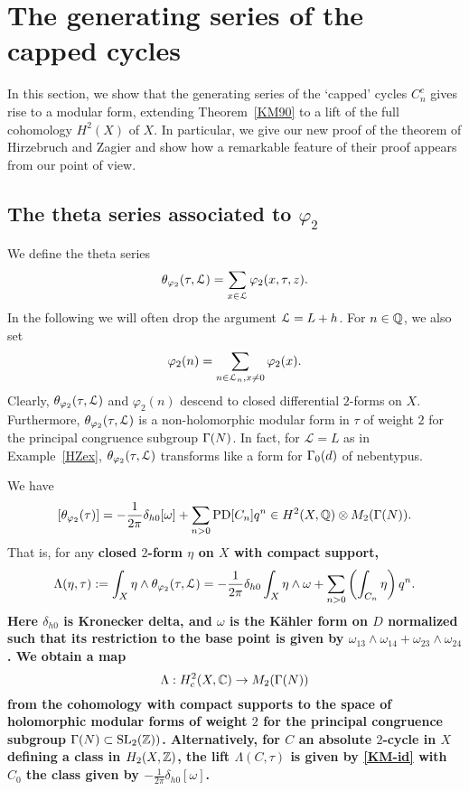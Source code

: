 \section{The generating series of the capped cycles}

In this section, we show that the generating series of the `capped'
cycles $C_n^c$ gives rise to a modular form, extending Theorem~\ref{KM90}
to a lift of the full cohomology $H^2(X)$ of $X$. In particular,
we give our new proof of the theorem of Hirzebruch and Zagier and
show how a remarkable feature of their proof appears from our point
of view.


\subsection{The theta series associated to $\varphi_2$}

We define the theta series
\[
\theta_{\varphi_2}(\tau,\mathcal{L}) = \sum_{x \in \mathcal{L}} \varphi_2(x,\tau,z).
\]
 In the following we will often drop the argument $\mathcal{L} = L+h$. For $n \in \mathbb{Q}$, we also set 
\[
\varphi_2(n) = \sum_{n \in \mathcal{L}_n, x \ne0} \varphi_2(x).
\]
Clearly, $\theta_{\varphi_2}(\tau,\mathcal{L})$ and $\varphi_2(n)$ descend
to closed differential $2$-forms on $X$. Furthermore,
$\theta_{\varphi_2}(\tau,\mathcal{L})$ is a non-holomorphic modular form
in $\tau$ of weight $2$ for the principal congruence subgroup
$\Gamma(N)$. In fact, for $\mathcal{L} = L$ as in Example~\ref{HZex},
$\theta_{\varphi_2}(\tau,\mathcal{L})$ transforms like a form for $\Gamma_0(d)$
of nebentypus.

\begin{theorem}\label{KM90}
We have
\[
[\theta_{\varphi_2}(\tau)] =  -\frac{1}{2\pi}\delta_{h0} [\omega] + \sum_{n>0} \operatorname{PD}[C_n] q^n \in H^2(X,\mathbb{Q}) \otimes M_2(\Gamma(N)).
\]
That is, for any \bf{closed} $2$-form $\eta$ on $X$ with compact support,
\[
\Lambda(\eta,\tau) := \int_X \eta \wedge \theta_{\varphi_2}(\tau,\mathcal{L})= -\frac{1}{2\pi}\delta_{h0} \int_X \eta \wedge \omega + \sum_{n>0} \left( \int_{C_n} \eta \right)q^n.
\]
Here $\delta_{h0}$ is Kronecker delta, and $\omega$ is the K{\"a}hler
form on $D$ normalized such that its restriction to the base point
is given by $\omega_{13}\wedge \omega_{14}+\omega_{23}\wedge
\omega_{24}$.
We obtain a map
\begin{equation}
\Lambda: H_c^{2}(X,\mathbb{C}) \to M_{2}(\Gamma(N))
\end{equation}
from the cohomology with compact supports to the space of holomorphic
modular forms of weight $2$ for the principal congruence subgroup
$\Gamma(N) \subset \operatorname{SL}_2(\mathbb{Z}))$. Alternatively, for $C$ an absolute
$2$-cycle in $X$ defining a class in $H_2(X,\mathbb{Z})$, the lift
$\Lambda(C,\tau)$ is given by \eqref{KM-id} with $C_0$ the class
given by $-\frac{1}{2\pi}\delta_{h0} [\omega]$.
\end{theorem}


